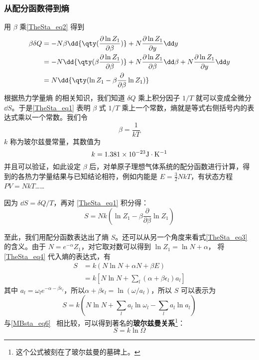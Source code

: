 \subsubsection{从配分函数得到熵}
用 $\beta$ 乘\autoref{TheSta_eq2} 得到
\begin{equation}\label{TheSta_eq1}
\begin{aligned}
\beta \delta Q&=-N\beta\dd{\qty(\frac{\partial \ln Z_1}{\partial \beta})}+N\frac{\partial \ln Z_1}{\partial y}\dd y\\
&=-N\dd{\qty(\beta\frac{\partial \ln Z_1}{\partial \beta})}+N\frac{\partial \ln Z_1}{\partial \beta}\dd \beta+N\frac{\partial \ln Z_1}{\partial y}\dd y\\
&=N\dd{\qty(\ln Z_1-\beta\frac{\partial }{\partial \beta}\ln Z_1)}
\end{aligned}
\end{equation}
根据热力学量熵 的相关知识，我们知道 $\delta Q$ 乘上积分因子 $1/T$ 就可以变成全微分 $\dd S$。于是\autoref{TheSta_eq1} 表明 $\beta$ 式 $1/T$ 乘上一个常数，熵就是等式右侧括号内的表达式乘以一个常数。我们令
\begin{equation}
\beta=\frac{1}{kT}
\end{equation}
$k$ 称为玻尔兹曼常量，其数值为
\begin{equation}
k=1.381\times 10^{-23} \rm{J\cdot K^{-1}}
\end{equation}
并且可以验证，如此设定 $\beta$ 后，对单原子理想气体系统的配分函数进行计算，得到的各热力学量结果与已知结论相符，例如内能是 $E=\frac{3}{2}NkT$，有状态方程 $PV=NkT$…… 

因为 $\dd S=\delta Q/T$，再对 \autoref{TheSta_eq1} 积分得：
\begin{equation}\label{TheSta_eq3}
S=Nk(\ln Z_1-\beta\frac{\partial }{\partial \beta}\ln Z_1)
\end{equation}

至此，我们用配分函数表达出了熵 $S$。还可以从另一个角度来看式\autoref{TheSta_eq3} 的含义。由于 $N=e^{-\alpha}Z_1$，对它取对数可以得到 $\ln Z_1=\ln N+\alpha$，
将\autoref{TheSta_eq4} 代入熵的表达式，有
\begin{equation}
\begin{aligned}
S&=k(N\ln N+\alpha N+\beta E)
\\&=k[N\ln N+\sum_l(\alpha+\beta\epsilon_l)a_l]
\end{aligned}
\end{equation}
其中 $a_l=\omega_le^{-\alpha-\beta\epsilon_l}$，所以$\alpha+\beta\epsilon_l=\ln(\omega/a_l)$，所以 $S$ 可以表示为
\begin{equation}
S=k(N\ln N+\sum_l a_l\ln\omega_l-\sum_l a_l\ln a_l)
\end{equation}
与\autoref{MBsta_eq6}~ 相比较，可以得到著名的\textbf{玻尔兹曼关系}\footnote{这个公式被刻在了玻尔兹曼的墓碑上。}：
\begin{equation}
S=k\ln \Omega
\end{equation}
